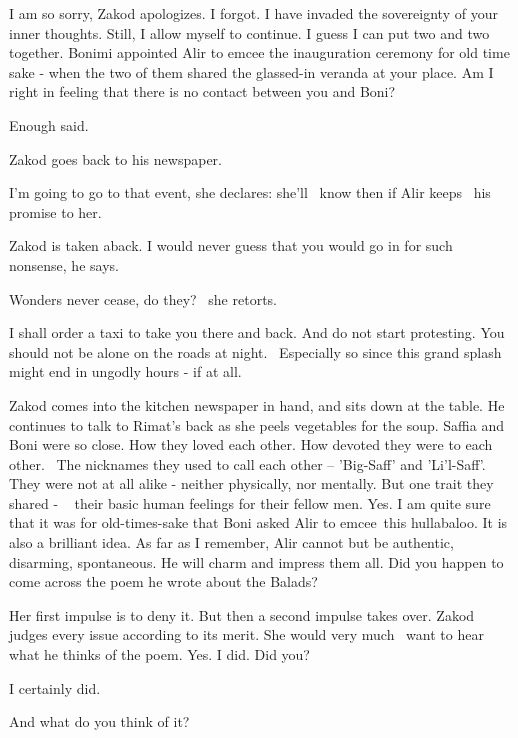 \documentclass[12pt]{book}
\begin{document}
{\textquotedbl}I am so sorry,{\textquotedbl} Zakod apologizes. {\textquotedbl}I forgot. I have invaded the sovereignty
of your inner thoughts. Still, I allow myself to continue. I guess I can put two and two together. Bonimi appointed
Alir to emcee the inauguration ceremony for old time sake - when the two of them shared the glassed-in veranda at your
place. Am I right in feeling that there is no contact between you and Boni?{\textquotedbl}

{\textquotedbl}Enough said.{\textquotedbl}

Zakod goes back to his newspaper.

{\textquotedbl}I'm going to go to that event,{\textquotedbl} she declares: she'll \ know then if Alir keeps \ his
promise to her.{ }

Zakod is taken aback. {\textquotedbl}I would never guess that you would go in for such nonsense,{\textquotedbl} he says.

{\textquotedbl}Wonders never cease, do they?{\textquotedbl} \ she retorts.

{\textquotedbl}I shall order a taxi to take you there and back. And do not start protesting. You should not be alone on
the roads at night. ~Especially so since this grand splash might end in ungodly hours - if at all.{\textquotedbl}~

Zakod comes into the kitchen newspaper in hand, and sits down at the table. He continues to talk to Rimat's back as she
peels vegetables for the soup. {\textquotedbl}Saffia and Boni were so close. How they loved each other. How devoted
they were to each other{.} \ The nicknames they used to call each other -- 'Big-Saff' and 'Li'l-Saff'.
They were not at all alike - neither physically, nor mentally. But one trait they shared -
~{ }their basic human feelings for their fellow men. Yes. I am quite sure that
it was for old-times-sake that Boni asked Alir to emcee~this hullabaloo. It is also a brilliant idea. As far as I
remember, Alir cannot but be authentic, disarming, spontaneous. He will charm and impress them all. Did you happen to
come across the poem he wrote about the Balads?{\textquotedbl}

Her first impulse is to deny it. But then a second impulse takes over. Zakod judges every issue according to its merit.
She would very much \ want to hear what he thinks of the poem. {\textquotedbl}Yes. I did. Did you?{\textquotedbl}

{\textquotedbl}I certainly did.{\textquotedbl}

{\textquotedbl}And what do you think of it?{\textquotedbl}
\end{document}
